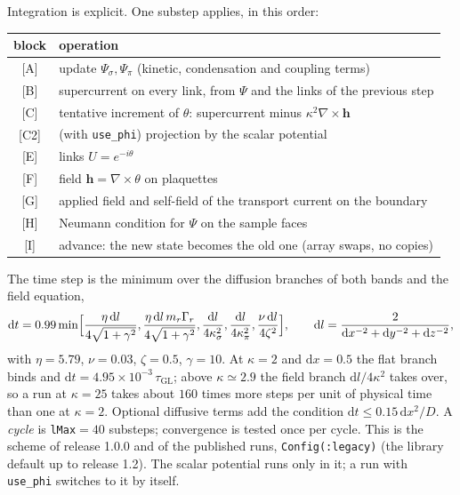 \documentclass[11pt,a4paper]{article}
\newcommand{\tGL}{\tau_{\mathrm{GL}}}
\newcommand{\code}[1]{\texttt{#1}}
\begin{document}
Integration is explicit. One substep applies, in this order:
\begin{center}
\begin{tabular}{cl}
\toprule
block & operation \\
\midrule
{[A]} & update $\Psi_\sigma,\Psi_\pi$ (kinetic, condensation and coupling terms) \\
{[B]} & supercurrent on every link, from $\Psi$ and the links of the previous step \\
{[C]} & tentative increment of $\theta$: supercurrent minus $\kappa^2\nabla\times\mathbf h$ \\
{[C2]} & (with \code{use\_phi}) projection by the scalar potential \\
{[E]} & links $U=e^{-i\theta}$ \\
{[F]} & field $\mathbf h=\nabla\times\theta$ on plaquettes \\
{[G]} & applied field and self-field of the transport current on the boundary \\
{[H]} & Neumann condition for $\Psi$ on the sample faces \\
{[I]} & advance: the new state becomes the old one (array swaps, no copies) \\
\bottomrule
\end{tabular}
\end{center}
The time step is the minimum over the diffusion branches of both bands and
the field equation,
\begin{equation}
  \mathrm dt=0.99\min\Bigl[\frac{\eta\,\mathrm dl}{4\sqrt{1+\gamma^2}},
  \frac{\eta\,\mathrm dl\,m_r\Gamma_r}{4\sqrt{1+\gamma^2}},
  \frac{\mathrm dl}{4\kappa_\sigma^2},\frac{\mathrm dl}{4\kappa_\pi^2},
  \frac{\nu\,\mathrm dl}{4\zeta^2}\Bigr],\qquad
  \mathrm dl=\frac{2}{\mathrm dx^{-2}+\mathrm dy^{-2}+\mathrm dz^{-2}},
\end{equation}
with $\eta=5.79$, $\nu=0.03$, $\zeta=0.5$, $\gamma=10$. At $\kappa=2$ and
$\mathrm dx=0.5$ the flat branch binds and $\mathrm dt=4.95\times10^{-3}\,\tGL$;
above $\kappa\simeq2.9$ the field branch $\mathrm dl/4\kappa^2$ takes over,
so a run at $\kappa=25$ takes about $160$ times more steps per unit of
physical time than one at $\kappa=2$. Optional diffusive terms add the
condition $\mathrm dt\le0.15\,\mathrm dx^2/D$. A \emph{cycle} is
\code{lMax}$=40$ substeps; convergence is tested once per cycle. This is the
scheme of release 1.0.0 and of the published runs, \code{Config(:legacy)} (the library default up to
release 1.2). The scalar potential runs only in it; a run with \code{use\_phi} switches to it by itself.
\end{document}
